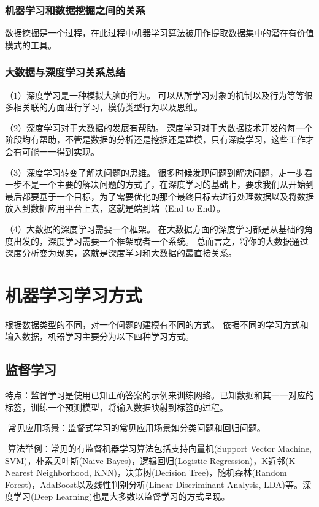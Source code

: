 \subsubsection{\textbf{机器学习和数据挖掘}之间的关系}
数据挖掘是一个过程，在此过程中机器学习算法被用作提取数据集中的潜在有价值模式的工具。
\subsubsection{大数据与深度学习关系总结}
（1）深度学习是一种模拟大脑的行为。
可以从所学习对象的机制以及行为等等很多相关联的方面进行学习，模仿类型行为以及思维。

（2）深度学习对于大数据的发展有帮助。
深度学习对于大数据技术开发的每一个阶段均有帮助，不管是数据的分析还是挖掘还是建模，只有深度学习，这些工作才会有可能一一得到实现。

（3）深度学习转变了解决问题的思维。
很多时候发现问题到解决问题，走一步看一步不是一个主要的解决问题的方式了，在深度学习的基础上，要求我们从开始到最后都要基于一个目标，为了需要优化的那个最终目标去进行处理数据以及将数据放入到数据应用平台上去，这就是端到端（End to End）。

（4）大数据的深度学习需要一个框架。
在大数据方面的深度学习都是从基础的角度出发的，深度学习需要一个框架或者一个系统。
总而言之，将你的大数据通过深度分析变为现实，这就是深度学习和大数据的最直接关系。

\section{机器学习学习方式}
\label{ux673aux5668ux5b66ux4e60ux5b66ux4e60ux65b9ux5f0f}
根据数据类型的不同，对一个问题的建模有不同的方式。
依据不同的学习方式和输入数据，机器学习主要分为以下四种学习方式。

\subsection{ 监督学习}\label{ux76d1ux7763ux5b66ux4e60}

​
特点：监督学习是使用已知正确答案的示例来训练网络。已知数据和其一一对应的标签，训练一个预测模型，将输入数据映射到标签的过程。

​ 常见应用场景：监督式学习的常见应用场景如分类问题和回归问题。

​ 算法举例：常见的有监督机器学习算法包括支持向量机(Support Vector
Machine, SVM)，朴素贝叶斯(Naive Bayes)，逻辑回归(Logistic
Regression)，K近邻(K-Nearest Neighborhood, KNN)，决策树(Decision
Tree)，随机森林(Random Forest)，AdaBoost以及线性判别分析(Linear
Discriminant Analysis, LDA)等。深度学习(Deep
Learning)也是大多数以监督学习的方式呈现。

